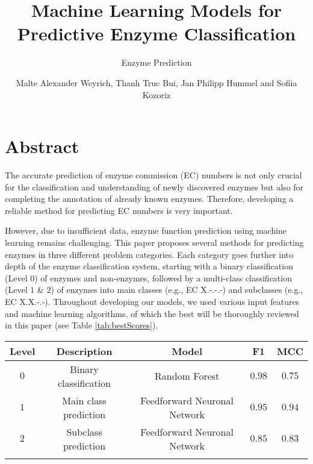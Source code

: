 \documentclass{bioinfo}
\begin{document}

\subtitle{Enzyme Prediction}

\title[]{Machine Learning Models for Predictive Enzyme Classification}
\author[]{Malte Alexander Weyrich, Thanh Truc Bui, Jan Philipp Hummel
and  Sofiia Kozoriz}

\address{}
\corresp{}
\history{}
\editor{}

\abstract{}

\maketitle

\section{Abstract}
The accurate prediction of enzyme commission (EC) numbers is not only crucial for 
the classification and understanding of newly discovered enzymes but also for completing the annotation of already known enzymes.
Therefore, developing a reliable method for predicting EC numbers is very important.

However, due to insufficient data, enzyme function prediction using machine learning remains challenging.
This paper proposes several methods for predicting enzymes in three different problem categories. Each category goes further into depth
of the enzyme classification system, starting with a binary classification (Level $0$) of enzymes and non-enzymes, followed by a multi-class classification (Level $1$ \& $2$) of enzymes into main classes (e.g., EC X.-.-.-) and subclasses (e.g., EC X.X.-.-).
Throughout developing our models, we used various input features and machine learning algorithms, of which the best will be thoroughly reviewed in this paper (see Table \ref{tab:bestScores}).

\begin{table}[!htbp]
 {\begin{tabular}{@{}ccccc@{}}\toprule 
		Level & Description & Model & F1 & MCC \\\midrule
		$0$ & Binary classification & Random Forest & $0.98$ & $0.75$ \\
		$1$ & Main class prediction &  Feedforward Neuronal Network & $0.95$ & $0.94$ \\
		$2$ & Subclass prediction&  Feedforward Neuronal Network & $0.85$ & $0.83$ \\\botrule
\end{tabular}}{}
\end{table}
\end{document}
